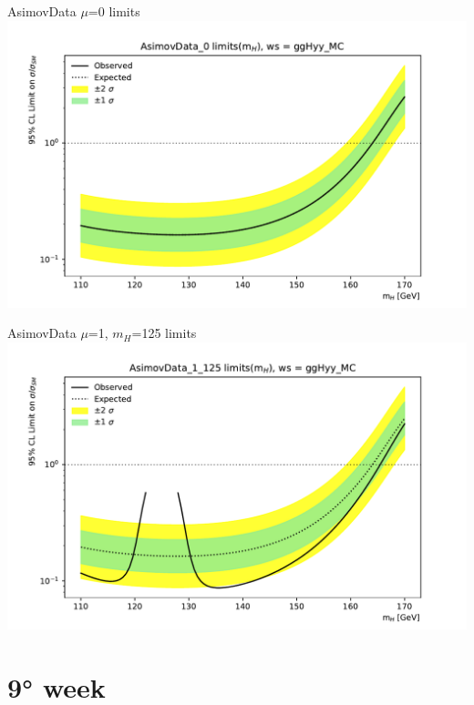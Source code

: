\documentclass[10pt,UKenglish, leqno, xcolor = dvipsnames]{beamer}
\begin{document}
		\begin{frame}{AsimovData $\mu$=0 limits}
			\vfill
			\includegraphics[width=1.\textwidth]{../images/plot_AsimovData_0_ggHyy_MC.pdf}
			\vfill
		\end{frame}
		
		\begin{frame}{AsimovData $\mu$=1, $m_H$=125 limits}
			\vfill
			\includegraphics[width=1.\textwidth]{../images/plot_AsimovData_1_125_ggHyy_MC.pdf}
			\vfill
		\end{frame}
		
	\section{9° week}
	\SectionPage
		
\end{document}
